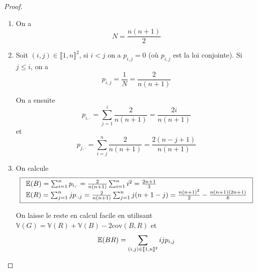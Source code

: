 \documentclass[12pt]{article}
\begin{document}
\begin{proof}
    \phantom{}
    \begin{enumerate}
        \item On a 
        \begin{equation}
            \boxed{N=\frac{n(n+1)}{2}}
        \end{equation}

        \item Soit $(i,j)\in\llbracket1,n\rrbracket^{2}$, si $i<j$ on a $p_{i,j}=0$ (où $p_{i,j}$ est la loi conjointe). Si $j\leqslant i$, on a
        \begin{equation}
            p_{i,j}=\frac{1}{N}=\frac{2}{n(n+1)}
        \end{equation}

        On a ensuite 
        \begin{equation}
            \boxed{p_{i,\cdot}=\sum_{j=1}^{i}\frac{2}{n(n+1)}}=\frac{2i}{n(n+1)}
        \end{equation}
        et 
        \begin{equation}
            \boxed{p_{j,\cdot}}=\sum_{i=j}^{n}\frac{2}{n(n+1)}=\frac{2(n-j+1)}{n(n+1)}
        \end{equation}

        \item On calcule 
        \begin{equation}
            \boxed{
                \begin{array}[]{l}
                    \E(B)=\sum_{i=1}^{n}p_{i,\cdot}=\frac{2}{n(n+1)}\sum_{i=1}^{n}i^{2}=\frac{2n+1}{3}\\
                    \E(R)=\sum_{j=1}^{n}jp_{\cdot,j}=\frac{2}{n(n+1)}\sum_{j=1}^{n}j(n+1-j)=\frac{n(n+1)^{2}}{2}-\frac{n(n+1)(2n+1)}{6}
                \end{array}
            }
        \end{equation}

        On laisse le reste en calcul facile en utilisant $\mathbb{V}(G)=\mathbb{V}(R)+\mathbb{V}(B)-2\mathrm{cov}(B,R)$ et 
        \begin{equation}
            \mathbb{E}(BR)=\sum_{(i,j)\in\llbracket1,n\rrbracket^{2}}ijp_{i,j}
        \end{equation}
    \end{enumerate}
\end{proof}
\end{document}
